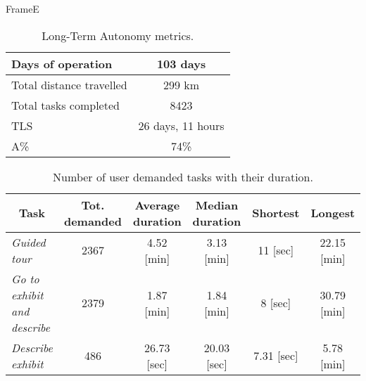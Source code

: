 \documentclass[english,svgnames,notes=hide,aspectratio=169,14pt]{beamer}
\begin{document}

\begin{frame}{FrameE}

   \tiny

   \begin{table}

      \caption{Long-Term Autonomy metrics.}
      \label{tab:metrics}
      \centering

      \begin{tabular}{|l|c|}
         \hline
            {Days of operation} & 103 days \\
         \hline
            {Total distance travelled} & 299 km \\
         \hline
            {Total tasks completed} & 8423 \\
         \hline
            {TLS} & 26 days, 11 hours \\
         \hline
            {A\%} & 74\% \\
         \hline
      \end{tabular}

   \end{table}

   \begin{table}

      \caption{Number of user demanded tasks with their duration.}
      \label{tab:dem_tasks}
      \centering

      \begin{tabular}{|l|c|c|c|c|c|}
         \hline
            \multicolumn{1}{|c|}{\textbf{Task}} &
            \multicolumn{1}{c|}{\textbf{Tot. demanded}} &
            \textbf{Average duration} &
            \textbf{Median duration} &
            \textbf{Shortest} &
            \textbf{Longest} \\
         \hline
            \textit{{Guided tour}} &
            2367 &
            4.52 {[}min{]} &
            3.13 {[}min{]} &
            11 {[}sec{]} &
            22.15 {[}min{]} \\
         \hline
            \textit{{Go to exhibit and describe}} &
            2379 &
            1.87 {[}min{]} &
            1.84 {[}min{]} &
            8 {[}sec{]} &
            30.79 {[}min{]} \\
         \hline
            \textit{{Describe exhibit}} &
            486 &
            26.73 {[}sec{]} &
            20.03 {[}sec{]} &
            7.31 {[}sec{]} &
            5.78 {[}min{]} \\
         \hline
      \end{tabular}

   \end{table}

\end{frame}
\end{document}
